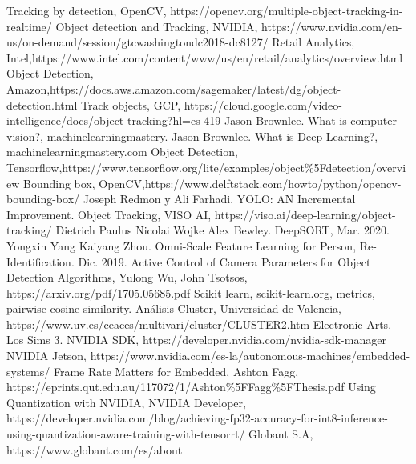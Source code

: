 \documentclass[a4paper]{IEEEtran}
\begin{document}
\begin{thebibliography}{00}

 Tracking by detection, OpenCV, https://opencv.org/multiple-object-tracking-in-realtime/
 Object detection and Tracking, NVIDIA, https://www.nvidia.com/en-us/on-demand/session/gtcwashingtondc2018-dc8127/
 Retail Analytics, Intel,\newline https://www.intel.com/content/www/us/en/retail/analytics/overview.html
 Object Detection, Amazon,\newline https://docs.aws.amazon.com/sagemaker/latest/dg/object-detection.html
 Track objects, GCP, https://cloud.google.com/video-intelligence/docs/object-tracking?hl=es-419
 Jason Brownlee. What is computer vision?, machinelearningmastery.
 Jason Brownlee. What is Deep Learning?, machinelearningmastery.com
 Object Detection, Tensorflow,\newline https://www.tensorflow.org/lite/examples/object\%5Fdetection/overview
 Bounding box, OpenCV,https://www.delftstack.com/howto/python/opencv-bounding-box/
 Joseph Redmon y Ali Farhadi. YOLO: AN Incremental Improvement.
 Object Tracking, VISO AI, https://viso.ai/deep-learning/object-tracking/
 Dietrich Paulus Nicolai Wojke Alex Bewley. DeepSORT, Mar. 2020.
 Yongxin Yang Kaiyang Zhou. Omni-Scale Feature Learning for Person, Re-Identification. Dic. 2019.
 Active Control of Camera Parameters for Object Detection Algorithms, Yulong Wu, John Tsotsos, https://arxiv.org/pdf/1705.05685.pdf
 Scikit learn, scikit-learn.org, metrics, pairwise cosine similarity.
 Análisis Cluster, Universidad de Valencia, https://www.uv.es/ceaces/multivari/cluster/CLUSTER2.htm
 Electronic Arts. Los Sims 3.
 NVIDIA SDK, https://developer.nvidia.com/nvidia-sdk-manager
 NVIDIA Jetson, https://www.nvidia.com/es-la/autonomous-machines/embedded-systems/
 Frame Rate Matters for Embedded, Ashton Fagg, https://eprints.qut.edu.au/117072/1/Ashton\%5FFagg\%5FThesis.pdf
 Using Quantization with NVIDIA, NVIDIA Developer, https://developer.nvidia.com/blog/achieving-fp32-accuracy-for-int8-inference-using-quantization-aware-training-with-tensorrt/
 Globant S.A, https://www.globant.com/es/about

\end{thebibliography}
\end{document}
